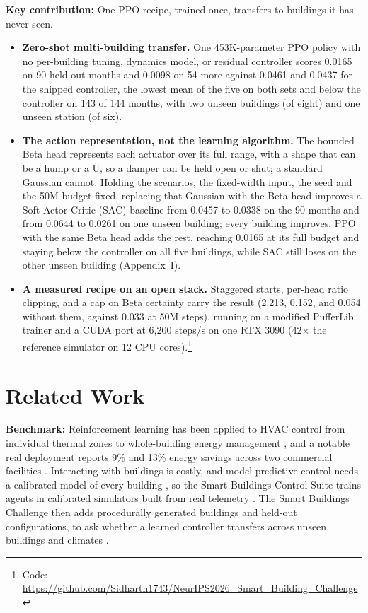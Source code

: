 \documentclass{article}
\begin{document}
\textbf{Key contribution:} One PPO recipe, trained once, transfers to buildings it has never seen.
\begin{itemize}
\item \textbf{Zero-shot multi-building transfer.} One 453K-parameter PPO \citep{schulman2017proximal} policy with no per-building tuning, dynamics model, or residual controller scores 0.0165 on 90 held-out months and 0.0098 on 54 more against 0.0461 and 0.0437 for the shipped controller, the lowest mean of the five on both sets and below the controller on 143 of 144 months, with two unseen buildings (of eight) and one unseen station (of six).
\item \textbf{The action representation, not the learning algorithm.} The bounded Beta head represents each actuator over its full range, with a shape that can be a hump or a U, so a damper can be held open or shut; a standard Gaussian cannot. Holding the scenarios, the fixed-width input, the seed and the 50M budget fixed, replacing that Gaussian with the Beta head improves a Soft Actor-Critic (SAC) \citep{haarnoja2018sac} baseline from 0.0457 to 0.0338 on the 90 months and from 0.0644 to 0.0261 on one unseen building; every building improves. PPO with the same Beta head adds the rest, reaching 0.0165 at its full budget and staying below the controller on all five buildings, while SAC still loses on the other unseen building (Appendix~I).
\item \textbf{A measured recipe on an open stack.} Staggered starts, per-head ratio clipping, and a cap on Beta certainty carry the result (2.213, 0.152, and 0.054 without them, against 0.033 at 50M steps), running on a modified PufferLib trainer and a CUDA port at 6,200 steps/s on one RTX 3090 (42$\times$ the reference simulator on 12 CPU cores).\footnote{Code: \url{https://github.com/Sidharth1743/NeurIPS2026_Smart_Building_Challenge}}
\end{itemize}
\section{Related Work}

\textbf{Benchmark:} Reinforcement learning has been applied to HVAC control from individual thermal zones to whole-building energy management \citep{wei2017deep,yu2021review}, and a notable real deployment reports 9\% and 13\% energy savings across two commercial facilities \citep{luo2022controlling}. Interacting with buildings is costly, and model-predictive control needs a calibrated model of every building \citep{afram2014theory}, so the Smart Buildings Control Suite trains agents in calibrated simulators built from real telemetry \citep{blum2019prototyping,goldfeder2024smart}. The Smart Buildings Challenge then adds procedurally generated buildings and held-out configurations, to ask whether a learned controller transfers across unseen buildings and climates \citep{goldfeder2026smart}.
\end{document}
